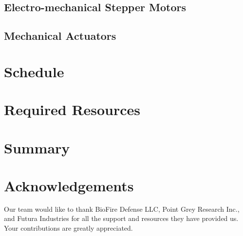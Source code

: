 \documentclass[11pt,english]{article}
\begin{document}
\subsection{Electro-mechanical Stepper Motors}
\label{sec:Stepper Motors}

\subsection{Mechanical Actuators}
\label{sec:Mechanical Actuators}

\section{Schedule}
\section{Required Resources}
\section{Summary}
\section{Acknowledgements}
Our team would like to thank BioFire Defense LLC, Point Grey Research Inc., and Futura Industries for all the support and resources they have provided us. Your contributions are greatly appreciated.
\end{document}
